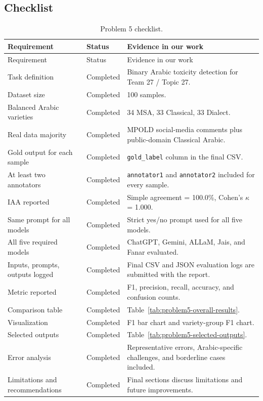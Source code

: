 \subsection{Checklist}
\begin{longtable}{p{}p{}p{}}
\caption{Problem 5 checklist.}\\
\toprule
Requirement & Status & Evidence in our work \\
\midrule
\endfirsthead
\toprule
Requirement & Status & Evidence in our work \\
\midrule
\endhead
Task definition & Completed & Binary Arabic toxicity detection for Team 27 / Topic 27. \\
Dataset size & Completed & 100 samples. \\
Balanced Arabic varieties & Completed & 34 MSA, 33 Classical, 33 Dialect. \\
Real data majority & Completed & MPOLD social-media comments plus public-domain Classical Arabic. \\
Gold output for each sample & Completed & \texttt{gold\_label} column in the final CSV. \\
At least two annotators & Completed & \texttt{annotator1} and \texttt{annotator2} included for every sample. \\
IAA reported & Completed & Simple agreement = 100.0\%, Cohen's $\kappa$ = 1.000. \\
Same prompt for all models & Completed & Strict yes/no prompt used for all five models. \\
All five required models & Completed & ChatGPT, Gemini, ALLaM, Jais, and Fanar evaluated. \\
Inputs, prompts, outputs logged & Completed & Final CSV and JSON evaluation logs are submitted with the report. \\
Metric reported & Completed & F1, precision, recall, accuracy, and confusion counts. \\
Comparison table & Completed & Table~\ref{tab:problem5-overall-results}. \\
Visualization & Completed & F1 bar chart and variety-group F1 chart. \\
Selected outputs & Completed & Table~\ref{tab:problem5-selected-outputs}. \\
Error analysis & Completed & Representative errors, Arabic-specific challenges, and borderline cases included. \\
Limitations and recommendations & Completed & Final sections discuss limitations and future improvements. \\
\bottomrule
\end{longtable}

